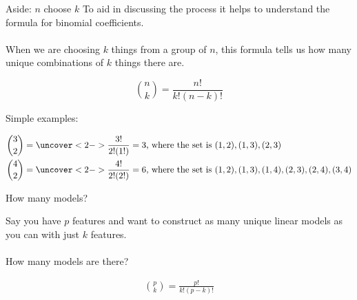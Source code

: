 \documentclass[mathserif, aspectratio=169]{beamer}
\begin{document}
\begin{frame}{Aside: $n$ choose $k$}
To aid in discussing the process it helps to understand the formula for binomial coefficients.\\~\\

When we are choosing $k$ things from a group of $n$, this formula tells us how many unique combinations of $k$ things there are.

\begin{equation}
{{n}\choose{k}} = \frac{n!}{k!(n-k)!}
\end{equation}

Simple examples:  

\begin{align*}
{{3}\choose{2}} &= \uncover<2->{\frac{3!}{2!(1!)} = 3\text{, where the set is } {(1,2), (1,3), (2,3)}}\\
{{4}\choose{2}} &= \uncover<2->{\frac{4!}{2!(2!)} = 6\text{, where the set is } {(1,2), (1,3), (1,4), (2,3), (2,4), (3,4)}}
\end{align*}
\end{frame}

\begin{frame}{How many models?}

Say you have $p$ features and want to construct as many unique linear models as you can with just $k$ features.  \\~\\

How many models are there?\\

\pause

\begin{align*}
{p\choose{k}} = \frac{p!}{k!(p-k)!}
\end{align*}

\end{frame}
\end{document}
